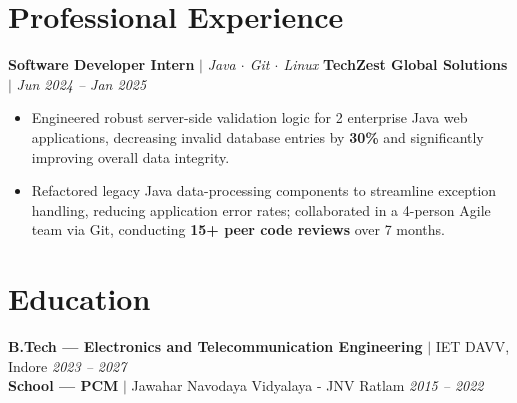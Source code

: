 \documentclass[a4paper,10pt]{article}
\begin{document}
\section*{Professional Experience}

\textbf{Software Developer Intern} $|$ \textit{Java $\cdot$ Git $\cdot$ Linux} \hfill \textbf{TechZest Global Solutions} $|$ \textit{Jun 2024 -- Jan 2025}
\begin{itemize}
  \item Engineered robust server-side validation logic for 2 enterprise Java web applications, decreasing invalid database entries by \textbf{30\%} and significantly improving overall data integrity.
  \item Refactored legacy Java data-processing components to streamline exception handling, reducing application error rates; collaborated in a 4-person Agile team via Git, conducting \textbf{15+ peer code reviews} over 7 months.
\end{itemize}

\section*{Education}
\textbf{B.Tech --- Electronics and Telecommunication Engineering} $|$ IET DAVV, Indore \hfill \textit{2023 -- 2027} \\
\textbf{School --- PCM} $|$ Jawahar Navodaya Vidyalaya - JNV Ratlam \hfill \textit{2015 -- 2022}
\end{document}
